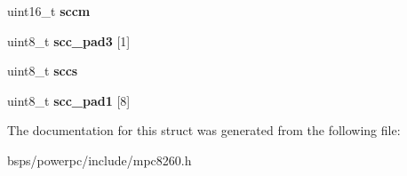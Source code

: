 \begin{DoxyCompactItemize}
uint16\+\_\+t {\bfseries sccm}
\item 
\mbox{\label{structm8260SCCRegisters___aee01adbd738b6062e5cefac5ac9f4118}} 
uint8\+\_\+t {\bfseries scc\+\_\+pad3} \mbox{[}1\mbox{]}
\item 
\mbox{\label{structm8260SCCRegisters___a9b8271768d483242d1f5b9c988ea9311}} 
uint8\+\_\+t {\bfseries sccs}
\item 
\mbox{\label{structm8260SCCRegisters___a0f12228f56e6f67a653f2a70b75c4792}} 
uint8\+\_\+t {\bfseries scc\+\_\+pad1} \mbox{[}8\mbox{]}
\end{DoxyCompactItemize}


The documentation for this struct was generated from the following file\+:\begin{DoxyCompactItemize}
\item 
bsps/powerpc/include/mpc8260.\+h\end{DoxyCompactItemize}
